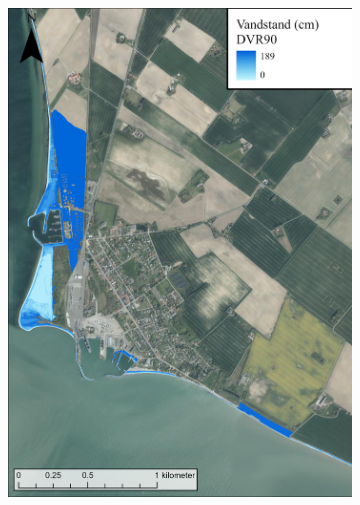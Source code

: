 \begin{figure}[H]
    \begin{subfigure}[t]{0.5\textwidth}
        \centering
        \includegraphics[width=0.95\linewidth]{images/Resultater/2023Malt/2023 resultat_gedser.jpg}
        \caption{}
        \label{Subfig: Målt Gedser}
    \end{subfigure}
    \begin{subfigure}[t]{0.5\textwidth}
        \centering

\end{subfigure}
\end{figure}
